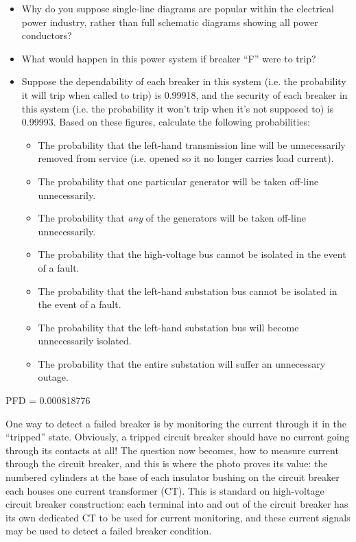 \begin{itemize}
\item{} Why do you suppose single-line diagrams are popular within the electrical power industry, rather than full schematic diagrams showing all power conductors?
\item{} What would happen in this power system if breaker ``F'' were to trip?
\item{} Suppose the dependability of each breaker in this system (i.e. the probability it will trip when called to trip) is 0.99918, and the security of each breaker in this system (i.e. the probability it won't trip when it's not supposed to) is 0.99993.  Based on these figures, calculate the following probabilities:
\begin{itemize}

\item{} The probability that the left-hand transmission line will be unnecessarily removed from service (i.e. opened so it no longer carries load current).
\item{} The probability that one particular generator will be taken off-line unnecessarily.
\item{} The probability that {\it any} of the generators will be taken off-line unnecessarily.
\item{} The probability that the high-voltage bus cannot be isolated in the event of a fault.
\item{} The probability that the left-hand substation bus cannot be isolated in the event of a fault.
\item{} The probability that the left-hand substation bus will become unnecessarily isolated.
\item{} The probability that the entire substation will suffer an unnecessary outage.
\end{itemize}
\end{itemize}







PFD = 0.000818776

\vskip 10pt

One way to detect a failed breaker is by monitoring the current through it in the ``tripped'' state.  Obviously, a tripped circuit breaker should have no current going through its contacts at all!  The question now becomes, how to measure current through the circuit breaker, and this is where the photo proves its value: the numbered cylinders at the base of each insulator bushing on the circuit breaker each houses one current transformer (CT).  This is standard on high-voltage circuit breaker construction: each terminal into and out of the circuit breaker has its own dedicated CT to be used for current monitoring, and these current signals may be used to detect a failed breaker condition.

